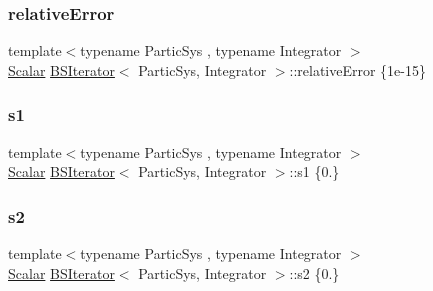 \mbox{\label{class_b_s_iterator_abce71b7bac10363f7772dc848f8722b6}} 
\subsubsection{\texorpdfstring{relative\+Error}{relativeError}}
{\footnotesize\ttfamily template$<$typename Partic\+Sys , typename Integrator $>$ \\
\mbox{\hyperlink{class_b_s_iterator_a7857f8ff9032955ea4dcc22cd18ca7a1}{Scalar}} \mbox{\hyperlink{class_b_s_iterator}{B\+S\+Iterator}}$<$ Partic\+Sys, Integrator $>$\+::relative\+Error \{1e-\/15\}\hspace{0.3cm}{\ttfamily [private]}}

\mbox{\label{class_b_s_iterator_a942f85e00c28ef1990d1dfbed69c9e13}} 
\subsubsection{\texorpdfstring{s1}{s1}}
{\footnotesize\ttfamily template$<$typename Partic\+Sys , typename Integrator $>$ \\
\mbox{\hyperlink{class_b_s_iterator_a7857f8ff9032955ea4dcc22cd18ca7a1}{Scalar}} \mbox{\hyperlink{class_b_s_iterator}{B\+S\+Iterator}}$<$ Partic\+Sys, Integrator $>$\+::s1 \{0.\}\hspace{0.3cm}{\ttfamily [private]}}

\mbox{\label{class_b_s_iterator_ad1cdde25df6bca7a456c1908be54065f}} 
\subsubsection{\texorpdfstring{s2}{s2}}
{\footnotesize\ttfamily template$<$typename Partic\+Sys , typename Integrator $>$ \\
\mbox{\hyperlink{class_b_s_iterator_a7857f8ff9032955ea4dcc22cd18ca7a1}{Scalar}} \mbox{\hyperlink{class_b_s_iterator}{B\+S\+Iterator}}$<$ Partic\+Sys, Integrator $>$\+::s2 \{0.\}\hspace{0.3cm}{\ttfamily [private]}}

